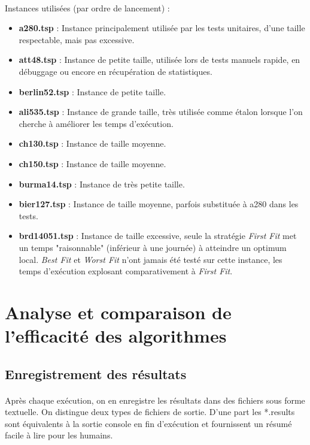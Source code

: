 \documentclass[a4paper,10pt]{report}
\begin{document}
\paragraph{}
Instances utilisées (par ordre de lancement) :
\begin{itemize}
  \item \textbf{a280.tsp} : Instance principalement utilisée par les tests
unitaires, d'une taille respectable, mais pas excessive.
  \item \textbf{att48.tsp} : Instance de petite taille, utilisée lors de tests
manuels rapide, en débuggage ou encore en récupération de statistiques.
  \item \textbf{berlin52.tsp} : Instance de petite taille.
  \item \textbf{ali535.tsp} : Instance de grande taille, très utilisée comme
étalon lorsque l'on cherche à améliorer les temps d'exécution.
  \item \textbf{ch130.tsp} : Instance de taille moyenne.
  \item \textbf{ch150.tsp} : Instance de taille moyenne.
  \item \textbf{burma14.tsp} : Instance de très petite taille.
  \item \textbf{bier127.tsp} : Instance de taille moyenne, parfois substituée à
a280 dans les tests.
  \item \textbf{brd14051.tsp} : Instance de taille excessive, seule la stratégie
\textit{First Fit} met un temps "raisonnable" (inférieur à une journée) à
atteindre un optimum local. \textit{Best Fit} et \textit{Worst Fit} n'ont jamais
été testé sur cette instance, les temps d'exécution explosant comparativement à
\textit{First Fit}.
\end{itemize}

\pagebreak
\section{Analyse et comparaison de l'efficacité des algorithmes}
\subsection{Enregistrement des résultats}

\paragraph{}
  Après chaque exécution, on en enregistre les résultats dans des fichiers sous
forme textuelle. On distingue deux types de fichiers de sortie. D'une part les
*.results sont équivalents à la sortie console en fin d'exécution et
fournissent un résumé facile à lire pour les humains.
\end{document}
